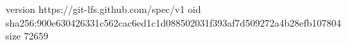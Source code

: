 version https://git-lfs.github.com/spec/v1
oid sha256:900e630426331c562cac6ed1c1d088502031f393af7d509272a4b28efb107804
size 72659
